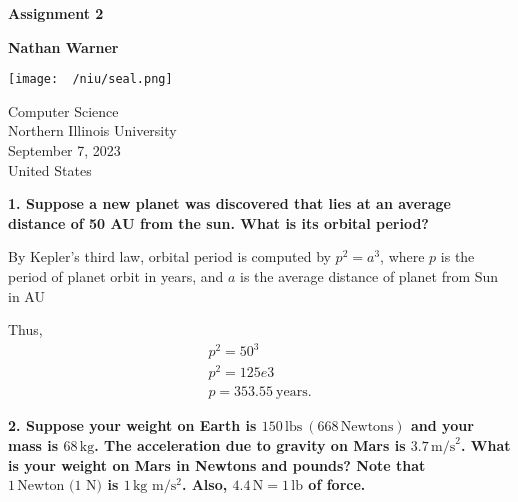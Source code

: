 \documentclass{report}
\title{\Huge{}}
\author{\huge{Nathan Warner}}
\date{\huge{}}
\begin{document}
        \begin{titlepage}
       \begin{center}
           \vspace*{1cm}
    
           \textbf{Assignment 2}
    
           \vspace{0.5cm}
            
                
           \vspace{1.5cm}
    
           \textbf{Nathan Warner}
    
           \vfill
                
                
           \vspace{0.8cm}
         
           \texttt{[image: ~/niu/seal.png]}
                
           Computer Science \\
           Northern Illinois University\\
           September 7, 2023 \\
           United States\\
           
                
       \end{center}
    \end{titlepage}
    \tableofcontents
    \pagebreak \bigbreak \noindent
    \begin{mdframed}
        \textbf{1. Suppose a new planet was discovered that lies at an average distance of 50 AU from the sun. What is its orbital period?}
    \end{mdframed}
    \bigbreak \noindent 

    By Kepler's third law, orbital period is computed by $p^{2} = a^{3}$, where $p$ is the period of planet orbit in years, and $a$ is the average distance of planet from Sun in AU
    \bigbreak \noindent 

    Thus, 
    \begin{align*}
        p^{2} = 50^{3} \\
        p^{2} = 125e3 \\
        p = 353.55\ \text{years}
    .\end{align*}

    \bigbreak \noindent 
    \begin{mdframed}
        \textbf{2. Suppose your weight on Earth is \(150 \, \text{lbs}\ (668 \, \text{Newtons})\) and your mass is \(68 \, \text{kg}\). The acceleration due to gravity on Mars is \(3.7 \, \text{m/s}^2\). What is your weight on Mars in Newtons and pounds? 
        Note that \(1 \, \text{Newton (1 N)}\) is \(1 \, \text{kg m} / \text{s}^2\). Also, \(4.4 \, \text{N} = 1 \, \text{lb}\) of force.
}
    \end{mdframed}
    \bigbreak \noindent 
\end{document}
